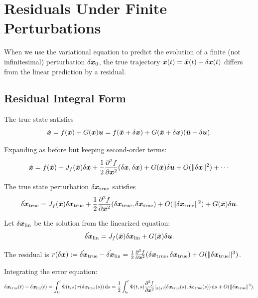 \section{Residuals Under Finite Perturbations}

When we use the variational equation to predict the evolution of a finite (not infinitesimal) perturbation
$\delta\bm{x}_0$, the true trajectory $\bm{x}(t) = \bar{\bm{x}}(t)+\delta\bm{x}(t)$ differs from the linear prediction by a residual.

\subsection{Residual Integral Form}

The true state satisfies
\begin{equation}
\dot{\bm{x}} = f(\bm{x}) + G(\bm{x})\bm{u} = f(\bar{\bm{x}}+\delta\bm{x}) + G(\bar{\bm{x}}+\delta\bm{x})(\bar{\bm{u}}+\delta\bm{u}).
\end{equation}

Expanding as before but keeping second-order terms:
\begin{equation}
\dot{\bm{x}} = f(\bar{\bm{x}}) + J_f(\bar{\bm{x}})\delta\bm{x} + \frac{1}{2}\frac{\partial^2 f}{\partial\bm{x}^2}(\delta\bm{x},\delta\bm{x}) + G(\bar{\bm{x}})\delta\bm{u} + O(\|\delta\bm{x}\|^2) + \cdots
\end{equation}

The true state perturbation $\delta\bm{x}_{\text{true}}$ satisfies
\begin{equation}
\dot{\delta\bm{x}}_{\text{true}} = J_f(\bar{\bm{x}})\delta\bm{x}_{\text{true}} + \frac{1}{2}\frac{\partial^2 f}{\partial\bm{x}^2}(\delta\bm{x}_{\text{true}}, \delta\bm{x}_{\text{true}})
+ O(\|\delta\bm{x}_{\text{true}}\|^2) + G(\bar{\bm{x}})\delta\bm{u}.
\end{equation}

Let $\delta\bm{x}_{\text{lin}}$ be the solution from the linearized equation:
\begin{equation}
\dot{\delta\bm{x}}_{\text{lin}} = J_f(\bar{\bm{x}})\delta\bm{x}_{\text{lin}} + G(\bar{\bm{x}})\delta\bm{u}.
\end{equation}

The residual is $r(\delta\bm{x}) := \dot{\delta\bm{x}}_{\text{true}} - \dot{\delta\bm{x}}_{\text{lin}} = \frac{1}{2}\frac{\partial^2 f}{\partial\bm{x}^2}(\delta\bm{x}_{\text{true}}, \delta\bm{x}_{\text{true}}) + O(\|\delta\bm{x}_{\text{true}}\|^3)$.

Integrating the error equation:
\begin{equation}
\delta\bm{x}_{\text{true}}(t) - \delta\bm{x}_{\text{lin}}(t) = \int_{t_0}^{t}\Phi(t,s)\,r(\delta\bm{x}_{\text{true}}(s))\,\mathrm{d} s
= \frac{1}{2}\int_{t_0}^{t}\Phi(t,s)\frac{\partial^2 f}{\partial\bm{x}^2}|_{\bm{x}(s)}(\delta\bm{x}_{\text{true}}(s), \delta\bm{x}_{\text{true}}(s))\,\mathrm{d} s + O(\|\delta\bm{x}_{\text{true}}\|^3).
\label{eq:ch2:residual-integral}
\end{equation}

